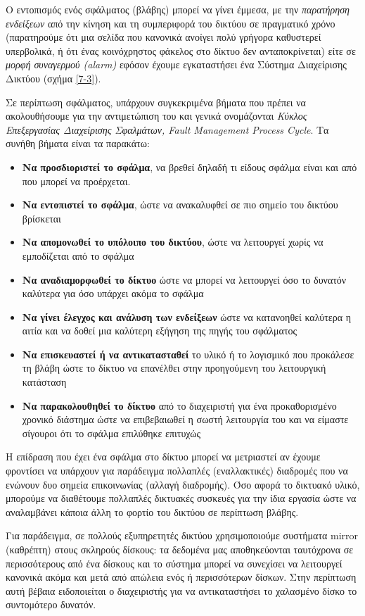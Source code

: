 Ο εντοπισμός ενός σφάλματος (βλάβης) μπορεί να γίνει έμμεσα, με την \emph{παρατήρηση ενδείξεων} από την κίνηση και τη συμπεριφορά του δικτύου σε πραγματικό χρόνο (παρατηρούμε ότι μια σελίδα που κανονικά ανοίγει πολύ γρήγορα καθυστερεί υπερβολικά, ή ότι ένας κοινόχρηστος φάκελος στο δίκτυο δεν ανταποκρίνεται) είτε σε \emph{μορφή συναγερμού (alarm)} εφόσον έχουμε εγκαταστήσει ένα Σύστημα Διαχείρισης Δικτύου (σχήμα \ref{7-3}). 

Σε περίπτωση σφάλματος, υπάρχουν συγκεκριμένα βήματα που πρέπει να ακολουθήσουμε για την αντιμετώπιση του και γενικά ονομάζονται \emph{Κύκλος Επεξεργασίας Διαχείρισης Σφαλμάτων, Fault Management Process Cycle}. Τα συνήθη βήματα είναι τα παρακάτω:

\begin{itemize}
\item \textbf{Να προσδιοριστεί το σφάλμα}, να βρεθεί δηλαδή τι είδους σφάλμα είναι και από που μπορεί να προέρχεται.
\item \textbf{Να εντοπιστεί το σφάλμα}, ώστε να ανακαλυφθεί σε πιο σημείο του δικτύου βρίσκεται
\item \textbf{Να απομονωθεί το υπόλοιπο του δικτύου}, ώστε να λειτουργεί χωρίς να εμποδίζεται από το σφάλμα
\item \textbf{Να αναδιαμορφωθεί το δίκτυο} ώστε να μπορεί να λειτουργεί όσο το δυνατόν καλύτερα για όσο υπάρχει ακόμα το σφάλμα
\item \textbf{Να γίνει έλεγχος και ανάλυση των ενδείξεων} ώστε να κατανοηθεί καλύτερα η αιτία και να δοθεί μια καλύτερη εξήγηση της πηγής του σφάλματος
\item \textbf{Να επισκευαστεί ή να αντικατασταθεί} το υλικό ή το λογισμικό που προκάλεσε τη βλάβη ώστε το δίκτυο να επανέλθει στην προηγούμενη του λειτουργική κατάσταση
\item \textbf{Να παρακολουθηθεί το δίκτυο} από το διαχειριστή για ένα προκαθορισμένο χρονικό διάστημα ώστε να επιβεβαιωθεί η σωστή λειτουργία του και να είμαστε σίγουροι ότι το σφάλμα επιλύθηκε επιτυχώς
\end{itemize}

Η επίδραση που έχει ένα σφάλμα στο δίκτυο μπορεί να μετριαστεί αν έχουμε φροντίσει να υπάρχουν για παράδειγμα πολλαπλές (εναλλακτικές) διαδρομές που να ενώνουν δυο σημεία επικοινωνίας (αλλαγή διαδρομής). Όσο αφορά το δικτυακό υλικό, μπορούμε να διαθέτουμε πολλαπλές δικτυακές συσκευές για την ίδια εργασία ώστε να αναλαμβάνει κάποια άλλη το φορτίο του δικτύου σε περίπτωση βλάβης. 

Για παράδειγμα, σε πολλούς εξυπηρετητές δικτύου χρησιμοποιούμε συστήματα mir\-ror (καθρέπτη) στους σκληρούς δίσκους: τα δεδομένα μας αποθηκεύονται ταυτόχρονα σε περισσότερους από ένα δίσκους και το σύστημα μπορεί να συνεχίσει να λειτουργεί κανονικά ακόμα και μετά από απώλεια ενός ή περισσότερων δίσκων. Στην περίπτωση αυτή βέβαια ειδοποιείται ο διαχειριστής για να αντικαταστήσει το χαλασμένο δίσκο το συντομότερο δυνατόν.


